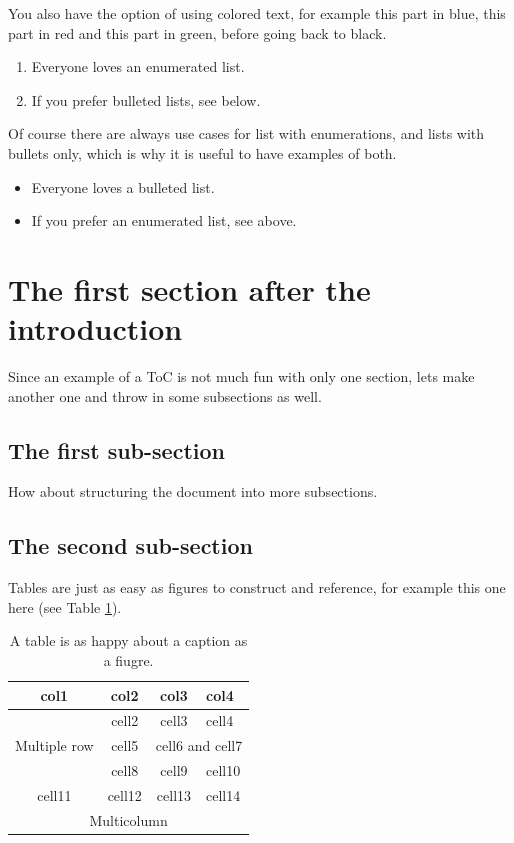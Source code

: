 \documentclass{smarthepnote}
\begin{document}
\FloatBarrier


You also have the option of using colored text, for example \color{blue} this part in blue,  \color{red} this part in red  \color{green} and this part in green, before \color{black} going back to black.  

\begin{enumerate}
\item Everyone loves an enumerated list.
\item If you prefer bulleted lists, see below.
\end{enumerate}

Of course there are always use cases for list with enumerations, and lists with bullets only, which is why it is useful to have examples of both.

\begin{itemize}
    \item Everyone loves a bulleted list.
    \item If you prefer an enumerated list, see above.
\end{itemize}

\section{The first section after the introduction}
Since an example of a ToC is not much fun with only one section, lets make another one and throw in some subsections as well.


\subsection{The first sub-section}
How about structuring the document into more subsections.

\subsection{The second sub-section}
Tables are just as easy as figures to construct and reference, for example this one here (see Table \ref{tab:exampletable}).

\begin{table}[h]
\begin{center}
\begin{tabular}{ |c|c|c|p{}| } 
    \hline
    \rowcolor{lightgray} 
    col1 & col2 & col3 & col4\\
    \hline
    \multirow{3}{4em}{Multiple row} & cell2 & cell3 & cell4 \\ 
    \cline{3-4}
    & cell5 & \multicolumn{2}{c|}{cell6 and cell7} \\
    \cline{3-4}
    & cell8 & cell9 & cell10 \\ 
    \hline
    cell11 & cell12 & cell13 & cell14 \\ 
    \hline
    \multicolumn{4}{|c|}{ Multicolumn} \\
    \hline
\end{tabular}
\end{center}
\caption{A table is as happy about a caption as a fiugre.}
\label{tab:exampletable}
\end{table}
\end{document}
